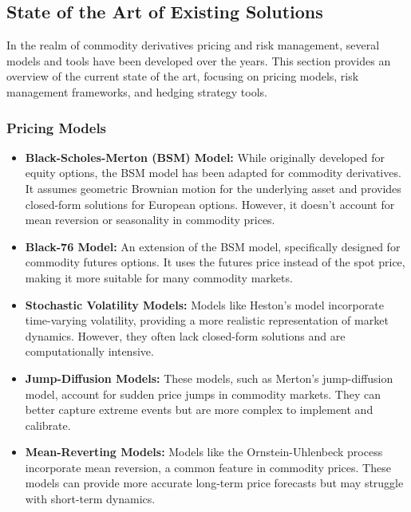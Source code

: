 \documentclass[12pt]{article}
\begin{document}
\subsection{State of the Art of Existing Solutions}
In the realm of commodity derivatives pricing and risk management, several models and tools have been developed over the years. This section provides an overview of the current state of the art, focusing on pricing models, risk management frameworks, and hedging strategy tools.
\subsubsection{Pricing Models}
\begin{itemize}
\item \textbf{Black-Scholes-Merton (BSM) Model:} While originally developed for equity options, the BSM model has been adapted for commodity derivatives. It assumes geometric Brownian motion for the underlying asset and provides closed-form solutions for European options. However, it doesn't account for mean reversion or seasonality in commodity prices.
\item \textbf{Black-76 Model:} An extension of the BSM model, specifically designed for commodity futures options. It uses the futures price instead of the spot price, making it more suitable for many commodity markets.

\item \textbf{Stochastic Volatility Models:} Models like Heston's model incorporate time-varying volatility, providing a more realistic representation of market dynamics. However, they often lack closed-form solutions and are computationally intensive.

\item \textbf{Jump-Diffusion Models:} These models, such as Merton's jump-diffusion model, account for sudden price jumps in commodity markets. They can better capture extreme events but are more complex to implement and calibrate.

\item \textbf{Mean-Reverting Models:} Models like the Ornstein-Uhlenbeck process incorporate mean reversion, a common feature in commodity prices. These models can provide more accurate long-term price forecasts but may struggle with short-term dynamics.
\end{itemize}
\end{document}
